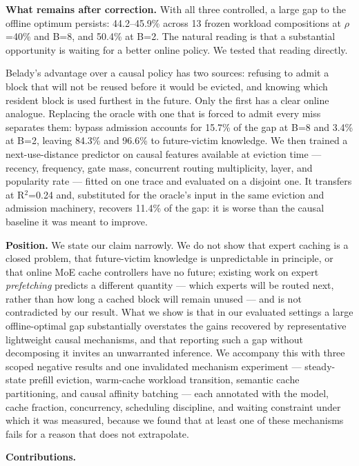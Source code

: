 \documentclass[
  10pt,
  letterpaper,
  10pt]{article}
\begin{document}
\textbf{What remains after correction.} With all three controlled, a
large gap to the offline optimum persists: 44.2--45.9\% across 13 frozen
workload compositions at \ensuremath{\rho}=40\% and B=8, and 50.4\% at
B=2. The natural reading is that a substantial opportunity is waiting
for a better online policy. We tested that reading directly.

Belady's advantage over a causal policy has two sources: refusing to
admit a block that will not be reused before it would be evicted, and
knowing which resident block is used furthest in the future. Only the
first has a clear online analogue. Replacing the oracle with one that is
forced to admit every miss separates them: bypass admission accounts for
15.7\% of the gap at B=8 and 3.4\% at B=2, leaving 84.3\% and 96.6\% to
future-victim knowledge. We then trained a next-use-distance predictor
on causal features available at eviction time --- recency, frequency,
gate mass, concurrent routing multiplicity, layer, and popularity rate
--- fitted on one trace and evaluated on a disjoint one. It transfers at
R\ensuremath{^2}=0.24 and, substituted for the oracle's input in the
same eviction and admission machinery, recovers \textminus{}11.4\% of
the gap: it is worse than the causal baseline it was meant to improve.

\textbf{Position.} We state our claim narrowly. We do not show that
expert caching is a closed problem, that future-victim knowledge is
unpredictable in principle, or that online MoE cache controllers have no
future; existing work on expert \emph{prefetching} predicts a different
quantity --- which experts will be routed next, rather than how long a
cached block will remain unused --- and is not contradicted by our
result. What we show is that in our evaluated settings a large
offline-optimal gap substantially overstates the gains recovered by
representative lightweight causal mechanisms, and that reporting such a
gap without decomposing it invites an unwarranted inference. We
accompany this with three scoped negative results and one invalidated
mechanism experiment --- steady-state prefill eviction, warm-cache
workload transition, semantic cache partitioning, and causal affinity
batching --- each annotated with the model, cache fraction, concurrency,
scheduling discipline, and waiting constraint under which it was
measured, because we found that at least one of these mechanisms fails
for a reason that does not extrapolate.

\textbf{Contributions.}
\end{document}
